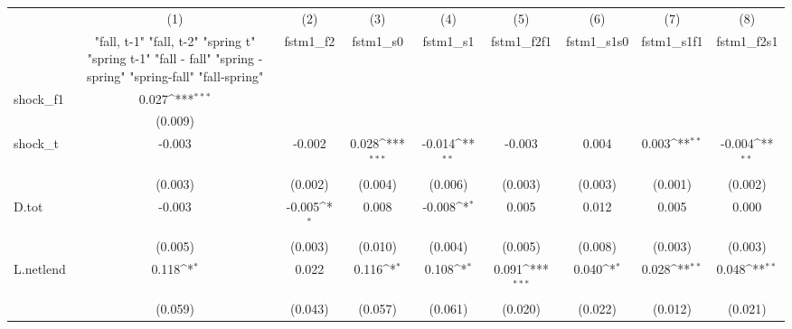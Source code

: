 {
\def\sym#1{\ifmmode^{#1}\else\(^{#1}\)\fi}
\begin{tabular}{l*{8}{c}}
\toprule
            &\multicolumn{1}{c}{(1)}&\multicolumn{1}{c}{(2)}&\multicolumn{1}{c}{(3)}&\multicolumn{1}{c}{(4)}&\multicolumn{1}{c}{(5)}&\multicolumn{1}{c}{(6)}&\multicolumn{1}{c}{(7)}&\multicolumn{1}{c}{(8)}\\
            &\multicolumn{1}{c}{  "fall, t-1" "fall, t-2" "spring t" "spring t-1"  "fall - fall" "spring - spring" "spring-fall" "fall-spring" }&\multicolumn{1}{c}{fstm1\_f2}&\multicolumn{1}{c}{fstm1\_s0}&\multicolumn{1}{c}{fstm1\_s1}&\multicolumn{1}{c}{fstm1\_f2f1}&\multicolumn{1}{c}{fstm1\_s1s0}&\multicolumn{1}{c}{fstm1\_s1f1}&\multicolumn{1}{c}{fstm1\_f2s1}\\
\midrule
shock\_f1    &       0.027\sym{***}&                     &                     &                     &                     &                     &                     &                     \\
            &     (0.009)         &                     &                     &                     &                     &                     &                     &                     \\
\addlinespace
shock\_t     &      -0.003         &      -0.002         &       0.028\sym{***}&      -0.014\sym{**} &      -0.003         &       0.004         &       0.003\sym{**} &      -0.004\sym{**} \\
            &     (0.003)         &     (0.002)         &     (0.004)         &     (0.006)         &     (0.003)         &     (0.003)         &     (0.001)         &     (0.002)         \\
\addlinespace
D.tot       &      -0.003         &      -0.005\sym{*}  &       0.008         &      -0.008\sym{*}  &       0.005         &       0.012         &       0.005         &       0.000         \\
            &     (0.005)         &     (0.003)         &     (0.010)         &     (0.004)         &     (0.005)         &     (0.008)         &     (0.003)         &     (0.003)         \\
\addlinespace
L.netlend   &       0.118\sym{*}  &       0.022         &       0.116\sym{*}  &       0.108\sym{*}  &       0.091\sym{***}&       0.040\sym{*}  &       0.028\sym{**} &       0.048\sym{**} \\
            &     (0.059)         &     (0.043)         &     (0.057)         &     (0.061)         &     (0.020)         &     (0.022)         &     (0.012)         &     (0.021)         \\

\end{tabular}}
